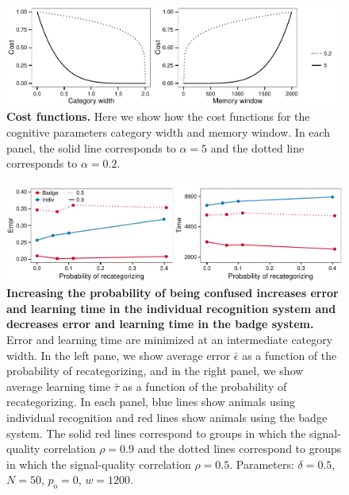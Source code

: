 \begin{figure}[ht]
\includegraphics[width=.8\textwidth]{figures/cost_functions.pdf}
\caption{\sffamily\small\textbf{Cost functions.} Here we show how the cost functions for the cognitive parameters category width and memory window. In each panel, the solid line corresponds to $\alpha=5$ and the dotted line corresponds to $\alpha=0.2$. }
\label{cost_fx}
\end{figure}

\begin{figure}[ht]
\includegraphics[width=6.85in]{figures/confusion_probs.pdf}
\caption{\sffamily\small\textbf{Increasing the probability of being confused increases error and learning time in the individual recognition system and decreases error and learning time in the badge system.} Error and learning time are minimized at an intermediate category width. In the left pane, we show average error $\bar{\epsilon}$ as a function of the probability of recategorizing, and in the right panel, we show average learning time $\bar{\tau}$ as a function of the probability of recategorizing. In each panel, blue lines show animals using individual recognition and red lines show animals using the badge system. The solid red lines correspond to groups in which the signal-quality correlation $\rho=0.9$ and the dotted lines correspond to groups in which the signal-quality correlation $\rho=0.5$. Parameters: $\delta = 0.5$, $N=50$, $p_\text{o}=0$, $w=1200$.}
\label{confusion_probs}
\end{figure}

